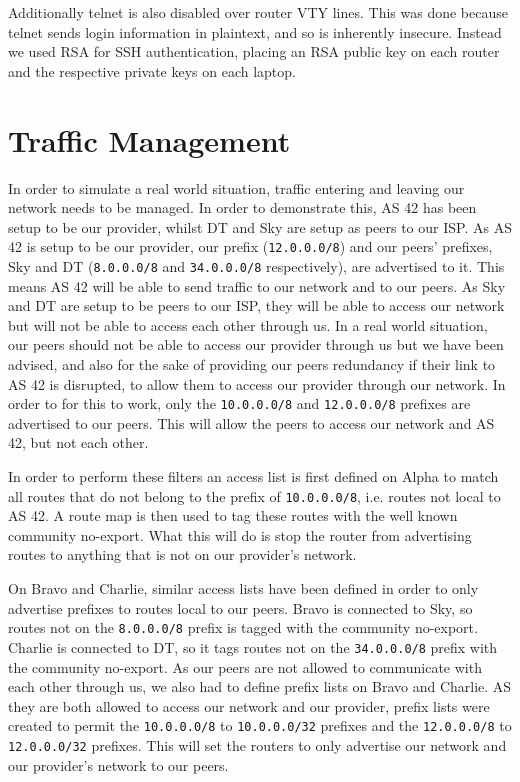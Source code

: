 Additionally telnet is also disabled over router VTY lines. This was done
because telnet sends login information in plaintext, and so is inherently
insecure. Instead we used RSA for SSH authentication, placing an RSA public key
on each router and the respective private keys on each laptop.


\section{Traffic Management}
In order to simulate a real world situation, traffic entering and leaving our
network needs to be managed. In order to demonstrate this, AS 42 has been setup
to be our provider, whilst DT and Sky are setup as peers to our ISP. As AS 42 is
setup to be our provider, our prefix (\texttt{12.0.0.0/8}) and our peers'
prefixes, Sky and DT (\texttt{8.0.0.0/8} and \texttt{34.0.0.0/8} respectively),
are advertised to it. This means AS 42 will be able to send traffic to our
network and to our peers. As Sky and DT are setup to be peers to our ISP, they
will be able to access our network but will not be able to access each other
through us. In a real world situation, our peers should not be able to access
our provider through us but we have been advised, and also for the sake of
providing our peers redundancy if their link to AS 42 is disrupted, to allow
them to access our provider through our network. In order to for this to work,
only the \texttt{10.0.0.0/8} and \texttt{12.0.0.0/8} prefixes are advertised to
our peers. This will allow the peers to access our network and AS 42, but not
each other.

In order to perform these filters an access list is first defined on Alpha to
match all routes that do not belong to the prefix of \texttt{10.0.0.0/8}, i.e.
routes not local to AS 42. A route map is then used to tag these routes with the
well known community no-export. What this will do is stop the router from
advertising routes to anything that is not on our provider's network.

On Bravo and Charlie, similar access lists have been defined in order to only
advertise prefixes to routes local to our peers. Bravo is connected to Sky, so
routes not on the \texttt{8.0.0.0/8} prefix is tagged with the community
no-export. Charlie is connected to DT, so it tags routes not on the
\texttt{34.0.0.0/8} prefix with the community no-export. As our peers are not
allowed to communicate with each other through us, we also had to define prefix
lists on Bravo and Charlie. AS they are both allowed to access our network and
our provider, prefix lists were created to permit the \texttt{10.0.0.0/8} to
\texttt{10.0.0.0/32} prefixes and the \texttt{12.0.0.0/8} to
\texttt{12.0.0.0/32} prefixes. This will set the routers to only advertise our
network and our provider's network to our peers.

